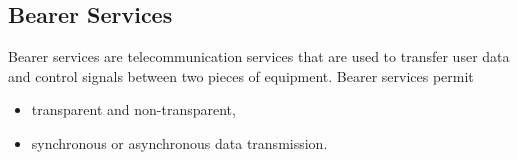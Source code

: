 %				
%


%

\subsection{Bearer Services}
Bearer services are telecommunication services that are used to transfer user data and control signals between two pieces of equipment.
Bearer services permit 
 \begin{itemize}
 	\item transparent and non-transparent, 
 	\item synchronous or asynchronous data transmission. 
 \end{itemize}

